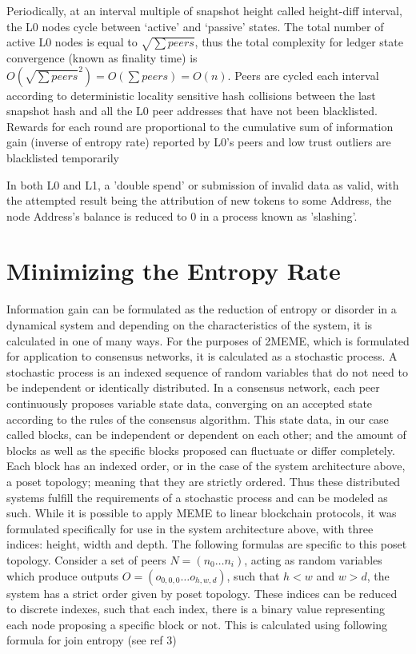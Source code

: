 \documentclass{article}
\begin{document}
Periodically, at an interval multiple of snapshot height called height-diff interval, the L0 nodes cycle between ‘active’ and ‘passive’ states. The total number of active L0 nodes is equal to $\sqrt{\sum peers}$, thus the total complexity for ledger state convergence (known as finality time) is $O(\sqrt{\sum peers}^2) = O(\sum peers)  = O(n)$. Peers are cycled each interval according to deterministic locality sensitive hash collisions between the last snapshot hash and all the L0 peer addresses that have not been blacklisted. Rewards for each round are proportional to the cumulative sum of information gain (inverse of entropy rate) reported by L0’s peers and low trust outliers are blacklisted temporarily 

In both L0 and L1, a 'double spend' or submission of invalid data as valid, with the attempted result being the attribution of new tokens to some Address, the node Address's balance is reduced to 0 in a process known as 'slashing'.

\section{Minimizing the Entropy Rate}
Information gain can be formulated as the reduction of entropy or disorder in a dynamical system and depending on the characteristics of the system, it is calculated in one of many ways. For the purposes of 2MEME, which is formulated for application to consensus networks, it is calculated as a stochastic process.
	A stochastic process is an indexed sequence of random variables that do not need to be independent or identically distributed. In a consensus network, each peer continuously proposes variable state data, converging on an accepted state according to the rules of the consensus algorithm. This state data, in our case called blocks, can be independent or dependent on each other; and the amount of blocks as well as the specific blocks proposed can fluctuate or differ completely. Each block has an indexed order, or in the case of the system architecture above, a poset topology; meaning that they are strictly ordered. Thus these distributed systems fulfill the requirements of a stochastic process and can be modeled as such. While it is possible to apply MEME to linear blockchain protocols, it was formulated specifically for use in the system architecture above, with three indices: height, width and depth. The following formulas are specific to this poset topology.
	Consider a set of peers $N = (n_0 …n_i)$, acting as random variables which produce outputs $O = (o_{0,0,0} … o_{h,w,d})$, such that $h<w$ and $w>d$, the system has a strict order given by poset topology. These indices can be reduced to discrete indexes, such that each index, there is a binary value representing each node proposing a specific block or not. This is calculated using following formula for join entropy (see ref 3) 
	
\end{document}
